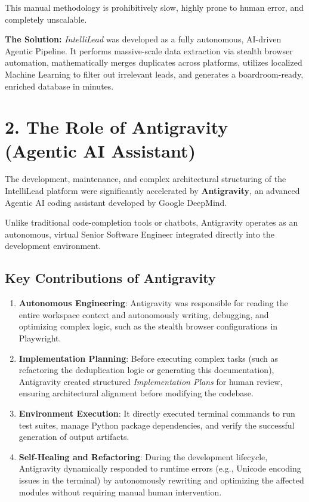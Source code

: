 \documentclass[12pt,a4paper]{article}
\begin{document}
This manual methodology is prohibitively slow, highly prone to human error, and completely unscalable. 

\textbf{The Solution:} \textit{IntelliLead} was developed as a fully autonomous, AI-driven Agentic Pipeline. It performs massive-scale data extraction via stealth browser automation, mathematically merges duplicates across platforms, utilizes localized Machine Learning to filter out irrelevant leads, and generates a boardroom-ready, enriched database in minutes.

\section{2. The Role of Antigravity (Agentic AI Assistant)}

The development, maintenance, and complex architectural structuring of the IntelliLead platform were significantly accelerated by \textbf{Antigravity}, an advanced Agentic AI coding assistant developed by Google DeepMind. 

Unlike traditional code-completion tools or chatbots, Antigravity operates as an autonomous, virtual Senior Software Engineer integrated directly into the development environment.

\subsection{Key Contributions of Antigravity}
\begin{enumerate}
    \item \textbf{Autonomous Engineering}: Antigravity was responsible for reading the entire workspace context and autonomously writing, debugging, and optimizing complex logic, such as the stealth browser configurations in Playwright.
    \item \textbf{Implementation Planning}: Before executing complex tasks (such as refactoring the deduplication logic or generating this documentation), Antigravity created structured \textit{Implementation Plans} for human review, ensuring architectural alignment before modifying the codebase.
    \item \textbf{Environment Execution}: It directly executed terminal commands to run test suites, manage Python package dependencies, and verify the successful generation of output artifacts.
    \item \textbf{Self-Healing and Refactoring}: During the development lifecycle, Antigravity dynamically responded to runtime errors (e.g., Unicode encoding issues in the terminal) by autonomously rewriting and optimizing the affected modules without requiring manual human intervention.
\end{enumerate}
\end{document}
